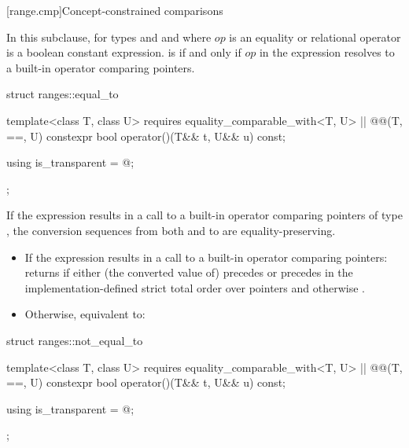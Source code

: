 [range.cmp]{Concept-constrained comparisons}

\pnum
In this subclause,  for types 
and  and where $op$ is an equality or relational
operator is a boolean constant expression.
 is  if and only if $op$
in the expression  resolves to a built-in
operator comparing pointers.

%
\begin{itemdecl}
struct ranges::equal_to {
  template<class T, class U>
    requires equality_comparable_with<T, U> || @@(T, ==, U)
    constexpr bool operator()(T&& t, U&& u) const;

  using is_transparent = @\unspecnc@;
};
\end{itemdecl}

\begin{itemdescr}
\pnum
\expects
If the expression 
results in a call to a built-in operator \tcode{==} comparing pointers of type
, the conversion sequences from both  and  to 
are equality-preserving.

\pnum
\effects
\begin{itemize}
\item
  If the expression  results in
  a call to a built-in operator \tcode{==} comparing pointers:
  returns  if either (the converted value of)  precedes
   or  precedes  in the implementation-defined strict
  total order over pointers and otherwise .

\item
  Otherwise, equivalent to:
\end{itemize}
\end{itemdescr}

%
\begin{itemdecl}
struct ranges::not_equal_to {
  template<class T, class U>
    requires equality_comparable_with<T, U> || @@(T, ==, U)
    constexpr bool operator()(T&& t, U&& u) const;

  using is_transparent = @\unspecnc@;
};
\end{itemdecl}


